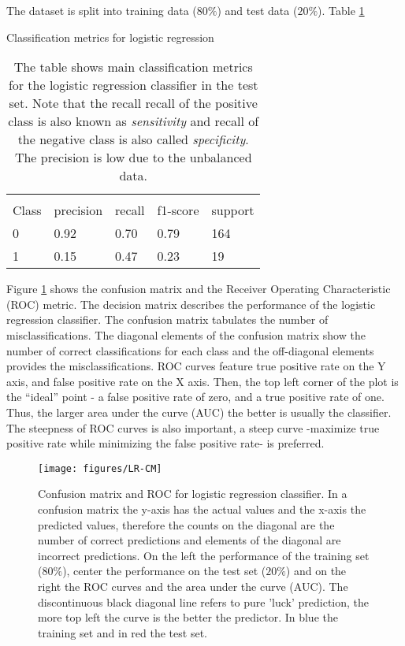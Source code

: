 \documentclass[11pt]{article}
\begin{document}
The dataset is split into training data ($80\%$) and test data ($20\%$). Table \ref{tab:logreg}

\begin{table}[H]
\caption{Classification metrics for logistic regression} \label{tab:logreg} 
\begin{center} 
\begin{tabular}{lllll}
\hline
\multicolumn{1}{c}{} \\
Class & precision & recall & f1-score & support     \\
\hline
0 & 0.92  &    0.70   &   0.79   &    164 \\
1 & 0.15  &    0.47   &   0.23   &     19 \\
\hline
\end{tabular}
\caption{The table shows  main classification metrics for the logistic regression classifier in the test set. Note that the recall recall of the positive class is also known as \emph{sensitivity} and recall of the negative class is also called \emph{specificity}. The precision is low due to the unbalanced data.}
\end{center}
\end{table}

Figure \ref{fig:lr-cm} shows the confusion matrix and the Receiver Operating Characteristic (ROC) metric. The decision matrix describes the performance of the logistic regression classifier. The confusion matrix tabulates the number of misclassifications. The diagonal elements of the confusion matrix show the number of correct classifications for each class and the off-diagonal elements provides the misclassifications. 
ROC curves feature true positive rate on the Y axis, and false positive rate on the X axis. Then, the top left corner of the plot is the “ideal” point - a false positive rate of zero, and a true positive rate of one. 
Thus, the larger area under the curve (AUC) the better is usually the classifier.
The steepness of ROC curves is also important, a steep curve -maximize true positive rate while minimizing the false positive rate- is preferred.

\begin{figure}[H]
        \centering
        \texttt{[image: figures/LR-CM]}
        \caption{Confusion matrix and ROC for logistic regression classifier. In a confusion matrix the y-axis has the actual values and the x-axis the predicted values, therefore the counts on the diagonal are the number of correct predictions and elements of the diagonal are incorrect predictions.
        On the left the performance of the training set ($80\%$), center the performance on the test set ($20\%$) and on the right the ROC curves and the area under the curve (AUC). The discontinuous black diagonal line refers to pure 'luck' prediction, the more top left the curve is the better the predictor. In blue the training set and in red the test set.}
\label{fig:lr-cm}
\end{figure}
\end{document}
